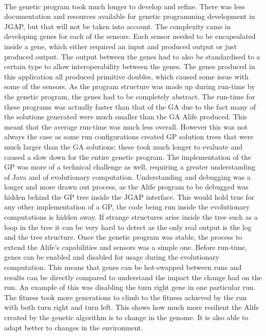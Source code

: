 \documentclass[12pt]{article}
\begin{document}
\paragraph{}
The genetic program took much longer to develop and refine. There was less documentation and resources available for genetic programming 
development in JGAP, but that will not be taken into account. The complexity came in developing genes for each of the sensors. Each sensor
needed to be encapsulated inside a gene, which either required an input and produced output or just produced output. The output between
the genes had to also be standardised to a certain type to allow interoperability between the genes. The genes produced in this application
all produced primitive doubles, which caused some issue with some of the sensors. As the program structure was made up during run-time by
the genetic program, the genes had to be completely abstract. The run-time for these programs was actually faster than that of the GA due
to the fact many of the solutions generated were much smaller than the GA Alife produced. This meant that the average run-time was much 
less overall. However this was not always the case as some run configurations created GP solution trees that were much larger than the 
GA solutions; these took much longer to evaluate and caused a slow down for the entire genetic program. The implementation of the GP was 
more of a technical challenge as well, requiring a greater understanding of Java and of evolutionary computation. Understanding and debugging
was a longer and more drawn out process, as the Alife program to be debugged was hidden behind the GP tree inside the JGAP interface.
This would hold true for any other implementation of a GP, the code being run inside the evolutionary computations is hidden away. If strange
structures arise inside the tree such as a loop in the tree it can be very hard to detect as the only real output is the log and
the tree structure. Once the genetic program was stable, the process to extend the Alife's capabilities and sensors was a simple one. Before
run-time, genes can be enabled and disabled for usage during the evolutionary computation. This means that genes can be hot-swapped between
runs and results can be directly compared to understand the impact the change had on the run. An example of this was disabling the turn
right gene in one particular run. The fitness took more generations to climb to the fitness achieved by the run with both turn right and
turn left. This shows how much more resilient the Alife created by the genetic algorithm is to change in the genome. It is also
able to adapt better to changes in the environment.
\end{document}
